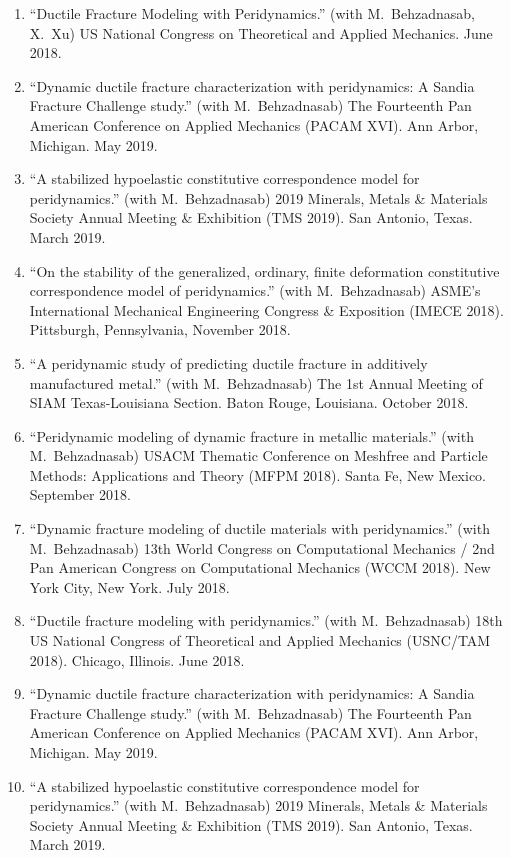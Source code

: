 \begin{enumerate}
  \item ``Ductile Fracture Modeling with Peridynamics.'' (with M.\ Behzadnasab, X.\ Xu) US National Congress on Theoretical and Applied Mechanics. June 2018.
  \item ``Dynamic ductile fracture characterization with peridynamics: A Sandia Fracture Challenge study.'' (with M.\ Behzadnasab) The Fourteenth Pan American Conference on Applied Mechanics (PACAM XVI). Ann Arbor, Michigan. May 2019.
  \item ``A stabilized hypoelastic constitutive correspondence model for peridynamics.'' (with M.\ Behzadnasab) 2019 Minerals, Metals \& Materials Society Annual Meeting \& Exhibition (TMS 2019). San Antonio, Texas. March 2019.
  \item ``On the stability of the generalized, ordinary, finite deformation constitutive correspondence model of peridynamics.'' (with M.\ Behzadnasab) ASME's International Mechanical Engineering Congress \& Exposition (IMECE 2018). Pittsburgh, Pennsylvania, November 2018.
  \item ``A peridynamic study of predicting ductile fracture in additively manufactured metal.'' (with M.\ Behzadnasab) The 1st Annual Meeting of SIAM Texas-Louisiana Section. Baton Rouge, Louisiana. October 2018. 
  \item ``Peridynamic modeling of dynamic fracture in metallic materials.'' (with M.\ Behzadnasab) USACM Thematic Conference on Meshfree and Particle Methods: Applications and Theory (MFPM 2018). Santa Fe, New Mexico. September 2018.
  \item ``Dynamic fracture modeling of ductile materials with peridynamics.'' (with M.\ Behzadnasab) 13th World Congress on Computational Mechanics / 2nd Pan American Congress on Computational Mechanics (WCCM 2018). New York City, New York. July 2018.
  \item ``Ductile fracture modeling with peridynamics.'' (with M.\ Behzadnasab) 18th US National Congress of Theoretical and Applied Mechanics (USNC/TAM 2018). Chicago, Illinois. June 2018. 
  \item ``Dynamic ductile fracture characterization with peridynamics: A Sandia Fracture Challenge study.'' (with M.\ Behzadnasab) The Fourteenth Pan American Conference on Applied Mechanics (PACAM XVI). Ann Arbor, Michigan. May 2019.
  \item ``A stabilized hypoelastic constitutive correspondence model for peridynamics.'' (with M.\ Behzadnasab) 2019 Minerals, Metals \& Materials Society Annual Meeting \& Exhibition (TMS 2019). San Antonio, Texas. March 2019.

\end{enumerate}
